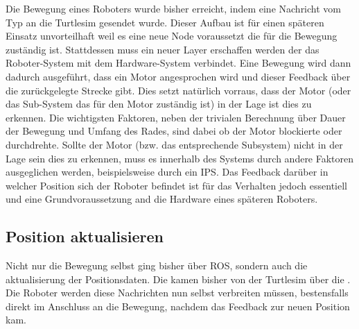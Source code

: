 Die Bewegung eines Roboters wurde bisher erreicht, indem eine Nachricht vom Typ  an die Turtlesim gesendet wurde. Dieser Aufbau ist für einen späteren Einsatz unvorteilhaft weil es eine neue Node voraussetzt die für die Bewegung zuständig ist. Stattdessen muss ein neuer Layer erschaffen werden der das Roboter-System mit dem Hardware-System verbindet. Eine Bewegung wird dann dadurch ausgeführt, dass ein Motor angesprochen wird und dieser Feedback über die zurückgelegte Strecke gibt. Dies setzt natürlich vorraus, dass der Motor (oder das Sub-System das für den Motor zuständig ist) in der Lage ist dies zu erkennen. Die wichtigsten Faktoren, neben der trivialen Berechnung über Dauer der Bewegung und Umfang des Rades, sind dabei ob der Motor blockierte oder durchdrehte. Sollte der Motor (bzw. das entsprechende Subsystem) nicht in der Lage sein dies zu erkennen, muss es innerhalb des Systems durch andere Faktoren ausgeglichen werden, beispielsweise durch ein \ac{IPS}. Das Feedback darüber in welcher Position sich der Roboter befindet ist für das Verhalten jedoch essentiell und eine Grundvoraussetzung and die Hardware eines späteren Roboters.

\subsection*{Position aktualisieren}

Nicht nur die Bewegung selbst ging bisher über ROS, sondern auch die aktualisierung der Positionsdaten. Die kamen bisher von der Turtlesim über die . Die Roboter werden diese Nachrichten nun selbst verbreiten müssen, bestensfalls direkt im Anschluss an die Bewegung, nachdem das Feedback zur neuen Position kam.



